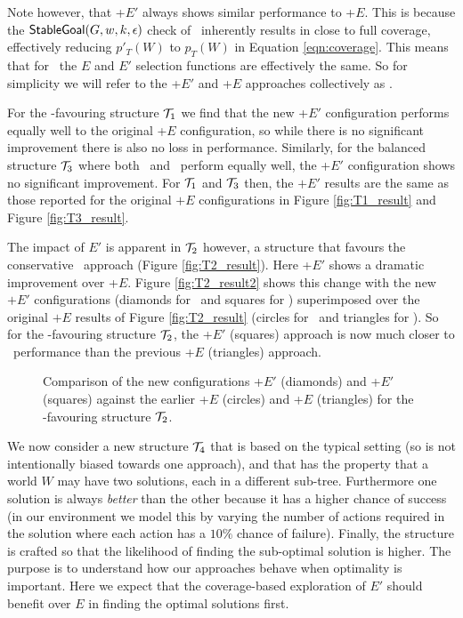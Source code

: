 Note however, that \BUL+$E'$ always shows similar performance to
\BUL+$E$. This is because the $\mathsf{StableGoal}(G,w,k,\epsilon)$ check of
\BUL\ inherently results in close to full coverage, effectively
reducing $p'_T(W)$ to $p_T(W)$ in Equation \ref{eqn:coverage}. This
means that for \BUL\, the $E$ and $E'$ selection functions are
effectively the same. So for simplicity we will refer to the \BUL+$E'$
and \BUL+$E$ approaches collectively as \BUL. 

For the \CL-favouring structure ${\mathcal{T}}_1$ we find that the new \CL+$E'$
configuration performs equally well to the original \CL+$E$
configuration, so while there is no significant improvement there is
also no loss in performance. Similarly, for the balanced structure
${\mathcal{T}}_3$ where both \CL\ and \BUL\ perform equally well, the \CL+$E'$
configuration shows no significant improvement. For ${\mathcal{T}}_1$ and ${\mathcal{T}}_3$
then, the $+E'$ results are the same as those reported for the
original $+E$ configurations in Figure \ref{fig:T1_result} and Figure
\ref{fig:T3_result}. 

The impact of $E'$ is apparent in $\T_2$ however, a structure that
favours the conservative \BUL\ approach (Figure
\ref{fig:T2_result}). Here \CL+$E'$ shows a dramatic improvement over
\CL+$E$. Figure \ref{fig:T2_result2} shows this change with the new
$+E'$ configurations (diamonds for \BUL\ and squares for \CL)
superimposed over the original $+E$ results of Figure
\ref{fig:T2_result} (circles for \BUL\ and triangles for \CL). So for
the \BUL-favouring structure $\T_2$, the \CL+$E'$ (squares) approach
is now much closer to \BUL\ performance than the previous \CL+$E$
(triangles) approach. 


\begin{figure*}[t]
\begin{center}
\subfigure[Structure $\T_2$]{\label{fig:T2_result2}

}
\qquad
\subfigure[Structure $\T_4$]{\label{fig:T4_result}

}

\caption{Comparison of the new configurations \BUL+$E'$ (diamonds) and \CL+$E'$
(squares) against the earlier \BUL+$E$ (circles) and \CL+$E$ (triangles) for the
\BUL-favouring structure $\T_2$.}
\end{center}
\end{figure*}


We now consider a new structure $\T_4$ that is based on the typical setting (so
is not intentionally biased towards one approach), and that has the property that
a world $W$ may have two solutions, each in a different sub-tree. Furthermore one
solution is always \textit{better} than the other because it has a higher chance
of success (in our environment we model this by varying the number of actions
required in the solution where each action has a $10\%$ chance of failure).
Finally, the structure is crafted so that the likelihood of finding the
sub-optimal solution is higher. The purpose is to understand how our approaches
behave when optimality is important. Here we expect that the coverage-based
exploration of $E'$ should benefit over $E$ in finding the optimal solutions
first.


